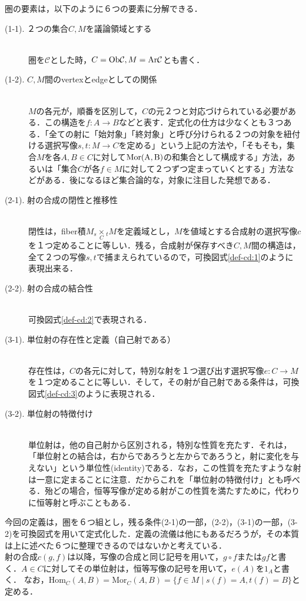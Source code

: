 \documentclass[uplatex, dvipdfmx]{jsreport}
\begin{document}
圏の要素は，以下のように６つの要素に分解できる．
\begin{description}
    \item[(1-1). ２つの集合$C,M$を議論領域とする]\mbox{}\\圏を$\mathcal{C}$とした時，$C=\mathrm{Ob}\mathcal{C}, M=\mathrm{Ar}\mathcal{C}$とも書く．
    \item[(1-2). $C,M$間のvertexとedgeとしての関係]\mbox{}\\$M$の各元が，順番を区別して，$C$の元２つと対応づけられている必要がある．この構造を$f:A\rightarrow B$などと表す．定式化の仕方は少なくとも３つある．「全ての射に「始対象」「終対象」と呼び分けられる２つの対象を紐付ける選択写像$s,t:M\rightarrow C$を定める」という上記の方法や，「そもそも，集合$M$を各$A,B\in C$に対して$\rm{Mor}(A,B)$の和集合として構成する」方法，あるいは「集合$C$が各$f\in M$に対して２つずつ定まっていくとする」方法などがある．後になるほど集合論的な，対象に注目した発想である．
    \item[(2-1). 射の合成の閉性と推移性]\mbox{}\\閉性は，fiber積$M_s\underset{C}{\times}{}_tM$を定義域とし，$M$を値域とする合成射の選択写像$c$を１つ定めることに等しい．残る，合成射が保存すべき$C,M$間の構造は，全て２つの写像$s,t$で捕まえられているので，可換図式\ref{def-cd:1}のように表現出来る．
    \item[(2-2). 射の合成の結合性]\mbox{}\\可換図式\ref{def-cd:2}で表現される．
    \item[(3-1). 単位射の存在性と定義（自己射である）]\mbox{}\\存在性は，$C$の各元に対して，特別な射を１つ選び出す選択写像$e:C\rightarrow M$を１つ定めることに等しい．そして，その射が自己射である条件は，可換図式\ref{def-cd:3}のように表現される．
    \item[(3-2). 単位射の特徴付け]\mbox{}\\単位射は，他の自己射から区別される，特別な性質を充たす．それは，「単位射との結合は，右からであろうと左からであろうと，射に変化を与えない」という単位性(identity)である．なお，この性質を充たすような射は一意に定まることに注意．だからこれを「単位射の特徴付け」とも呼べる．殆どの場合，恒等写像が定める射がこの性質を満たすために，代わりに恒等射と呼ぶこともある．
\end{description}

今回の定義は，圏を６つ組とし，残る条件(2-1)の一部，(2-2)，(3-1)の一部，(3-2)を可換図式を用いて定式化した．定義の流儀は他にもあるだろうが，その本質は上に述べた６つに整理できるのではないかと考えている．\\
射の合成$c(g,f)$は以降，写像の合成と同じ記号を用いて，$g\circ f$または$gf$と書く．$A\in C$に対してその単位射は，恒等写像の記号を用いて，$e(A)$を$1_A$と書く．
なお，$\mathrm{Hom}_C(A,B)=\mathrm{Mor}_C(A,B)=\{ f\in M\mid s(f)=A, t(f)=B \}$と定める．
\end{document}
